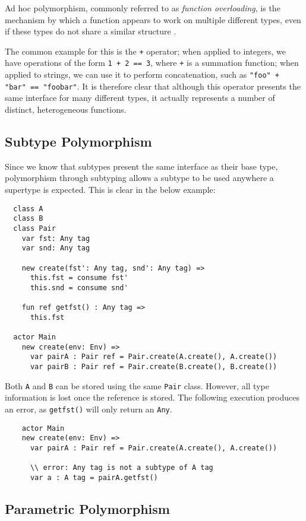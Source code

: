Ad hoc polymorphism, commonly referred to as \textit{function overloading}, is the mechanism by which a function appears to work on multiple different types, even if these types do not share a similar structure \cite{Cardelli1985}. 

The common example for this is the \texttt{+} operator; when applied to integers, we have operations of the form \texttt{1 + 2 == 3}, where \texttt{+} is a summation function; when applied to strings, we can use it to perform concatenation, such as \texttt{"foo" + "bar" == "foobar"}. It is therefore clear that although this operator presents the same interface for many different types, it actually represents a number of distinct, heterogeneous functions.

\subsection{Subtype Polymorphism}

Since we know that subtypes present the same interface as their base type, polymorphism through subtyping allows a subtype to be used anywhere a supertype is expected. This is clear in the below example:
\begin{verbatim}
  class A
  class B
  class Pair
    var fst: Any tag
    var snd: Any tag
  
    new create(fst': Any tag, snd': Any tag) =>
      this.fst = consume fst'
      this.snd = consume snd'
    
    fun ref getfst() : Any tag =>
      this.fst

  actor Main
    new create(env: Env) =>
      var pairA : Pair ref = Pair.create(A.create(), A.create())
      var pairB : Pair ref = Pair.create(B.create(), B.create())
\end{verbatim}
Both \texttt{A} and \texttt{B} can be stored using the same \texttt{Pair} class. However, all type information is lost once the reference is stored. The following execution produces an error, as \texttt{getfst()} will only return an \texttt{Any}.
\begin{verbatim}
    actor Main
    new create(env: Env) =>
      var pairA : Pair ref = Pair.create(A.create(), A.create())
      
      \\ error: Any tag is not a subtype of A tag
      var a : A tag = pairA.getfst() 
\end{verbatim}

\subsection{Parametric Polymorphism}

